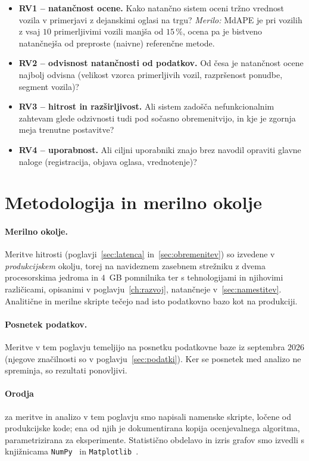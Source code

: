 \begin{itemize}
  \item \textbf{RV1 -- natančnost ocene.} Kako natančno sistem oceni tržno
        vrednost vozila v primerjavi z dejanskimi oglasi na trgu?
        \emph{Merilo:} MdAPE je pri vozilih z vsaj $10$ primerljivimi
        vozili manjša od $15\,\%$, ocena pa je bistveno natančnejša od
        preproste (naivne) referenčne metode.
  \item \textbf{RV2 -- odvisnost natančnosti od podatkov.} Od česa je
        natančnost ocene najbolj odvisna (velikost vzorca primerljivih vozil,
        razpršenost ponudbe, segment vozila)?
  \item \textbf{RV3 -- hitrost in razširljivost.} Ali sistem zadošča
        nefunkcionalnim zahtevam glede odzivnosti tudi pod sočasno
        obremenitvijo, in kje je zgornja meja trenutne postavitve?
  \item \textbf{RV4 -- uporabnost.} Ali ciljni uporabniki znajo brez navodil
        opraviti glavne naloge (registracija, objava oglasa, vrednotenje)?
\end{itemize}
\section{Metodologija in merilno okolje}
\label{sec:metodologija}

\paragraph{Merilno okolje.}
Meritve hitrosti (poglavji~\ref{sec:latenca} in~\ref{sec:obremenitev}) so
izvedene v \emph{produkcijskem} okolju, torej na navideznem zasebnem strežniku
z dvema procesorskima jedroma in $4$~GB pomnilnika ter s tehnologijami in
njihovimi različicami, opisanimi v poglavju~\ref{ch:razvoj}, natančneje
v~\ref{sec:namestitev}. Analitične in merilne skripte tečejo nad isto
podatkovno bazo kot na produkciji.

\paragraph{Posnetek podatkov.}
Meritve v tem poglavju temeljijo na posnetku podatkovne baze iz septembra
$2026$ (njegove značilnosti so v poglavju~\ref{sec:podatki}). Ker se posnetek
med analizo ne spreminja, so rezultati ponovljivi.

\paragraph{Orodja}
za meritve in analizo v tem poglavju smo napisali namenske skripte, ločene od
produkcijske kode; ena od njih je dokumentirana kopija ocenjevalnega
algoritma, parametrizirana za eksperimente. Statistično obdelavo in izris
grafov smo izvedli s knjižnicama \texttt{NumPy}~\cite{harris2020numpy} in
\texttt{Matplotlib}~\cite{hunter2007matplotlib}.

